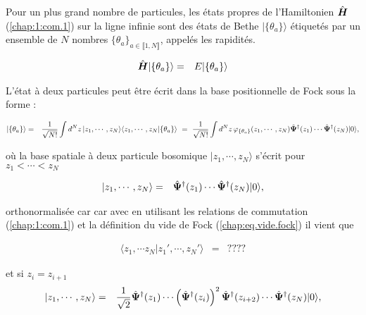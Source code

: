 Pour un plus grand nombre de particules, les états propres de l'Hamiltonien \(\hat{\bm{H}}\) (\ref{chap:1:com.1}) sur la ligne infinie sont des états de Bethe $\vert \{\theta_a\}\rangle $ étiquetés par un ensemble de $N$ nombres $\{\theta_a\}_{a \in \llbracket 1 , N \rrbracket } $, appelés les rapidités. %

\begin{eqnarray}
	\hat{\bm{H}} \vert \{\theta_a\}\rangle & = & E \vert \{\theta_a\}\rangle 		
\end{eqnarray}

L’état à deux particules peut être écrit dans la base positionnelle de Fock sous la forme :

\begin{eqnarray}
	\vert \{\theta_a\} \rangle & = & \frac{1}{\sqrt{N!}}\int d^Nz \, \vert z_1 , \cdots , z_N \rangle \langle z_1 , \cdots , z_N  \vert \{\theta_a\}  \rangle ~=~\frac{1}{\sqrt{N!}} \int d^Nz \, \varphi_{\{\theta_a\}}(z_1, \cdots ,  z_N) \hat{\bm{\Psi}}^\dag(z_1) \cdots  \hat{\bm{\Psi}}^\dag(z_N) \vert 0 \rangle, \label{chap:1:N.part}
\end{eqnarray}

où la base spatiale à deux particule bosomique $\vert z_1 , \cdots ,  z_N \rangle$ s'écrit pour $z_1 < \cdots <  z_N$

\begin{eqnarray}
	\vert z_1 , \cdots ,  z_N  \rangle  & = &  \hat{\bm{\Psi}}^\dag(z_1) \cdots \hat{\bm{\Psi}}^\dag(z_N) \vert 0 \rangle ,
\end{eqnarray}

orthonormalisée car car avec en utilisant les relations de commutation (\ref{chap:1:com.1})  et la définition du vide de Fock (\ref{chap:eq.vide.fock}) il vient que 

\begin{eqnarray}
	\langle z_1 , \cdots z_N \vert z_1' ,  \cdots , z_N' \rangle  & = & ???? 
\end{eqnarray}

et si $z_i =  z_{i+1} $
\begin{eqnarray}
	\vert z_1 , \cdots ,  z_N  \rangle  & = &  \frac{1}{\sqrt{2}} \hat{\bm{\Psi}}^\dag(z_1) \cdots \left(\hat{\bm{\Psi}}^\dag(z_i)\right)^2\hat{\bm{\Psi}}^\dag(z_{i+2}) \cdots \hat{\bm{\Psi}}^\dag(z_N) \vert 0 \rangle ,
\end{eqnarray}

